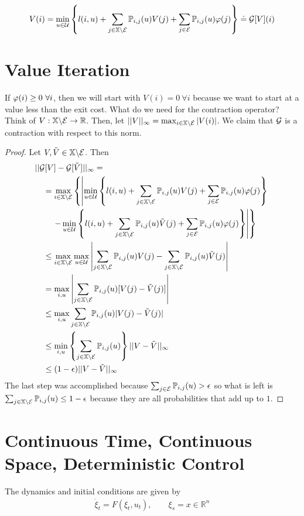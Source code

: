 \begin{equation*}
V(i) = \min_{u\in\mathcal{U}}\left\lbrace l(i,u) + \sum_{j\in\mathbb{X}\backslash\mathcal{E}}\mathbb{P}_{i,j}(u)V(j) + \sum_{j\in\mathcal{E}}\mathbb{P}_{i,j}(u)\varphi(j)\right\rbrace \doteq \mathcal{G}[V](i)
\end{equation*}


\section{Value Iteration}
If $\varphi(i)\geq0~\forall i$, then we will start with $V(i)=0~\forall i$ because we want to start at a value less than the exit cost.
What do we need for the contraction operator? Think of $V:\mathbb{X}\backslash\mathcal{E}\to\mathbb{R}$.
Then, let $||V||_\infty = \max_{i\in\mathbb{X}\backslash\mathcal{E}}|V(i)|$.
We claim that $\mathcal{G}$ is a contraction with respect to this norm.

\begin{proof}
Let $V,\tilde{V}\in\mathbb{X}\backslash\mathcal{E}$.
Then
\begin{align*}
&||\mathcal{G}[V]-\mathcal{G}[\tilde{V}]||_\infty = \\
&\quad = \max_{i\in\mathbb{X}\backslash\mathcal{E}}\left\lbrace \left| \min_{u\in\mathcal{U}}\left\lbrace l(i,u) + \sum_{j\in\mathbb{X}\backslash\mathcal{E}}\mathbb{P}_{i,j}(u)V(j) + \sum_{j\in\mathcal{E}}\mathbb{P}_{i,j}(u)\varphi(j)\right\rbrace \right.\right. \\
&\left.\left.\qquad - \min_{u\in\mathcal{U}}\left\lbrace l(i,u) + \sum_{j\in\mathbb{X}\backslash\mathcal{E}}\mathbb{P}_{i,j}(u)\tilde{V}(j) + \sum_{j\in\mathcal{E}}\mathbb{P}_{i,j}(u)\varphi(j) \right\rbrace\right|\right\rbrace \\
&\quad\leq \max_{i\in\mathbb{X}\backslash\mathcal{E}} \max_{u\in\mathcal{U}} \left|\sum_{j\in\mathbb{X}\backslash\mathcal{E}}\mathbb{P}_{i,j}(u)V(j) - \sum_{j\in\mathbb{X}\backslash\mathcal{E}}\mathbb{P}_{i,j}(u)\tilde{V}(j)\right| \\
&\quad= \max_{i,u} \left| \sum_{j\in\mathbb{X}\backslash\mathcal{E}}\mathbb{P}_{i,j}(u)[V(j)-\tilde{V}(j)]\right| \\
&\quad\leq \max_{i,u} \sum_{j\in\mathbb{X}\backslash\mathcal{E}}\mathbb{P}_{i,j}(u)|V(j)-\tilde{V}(j)| \\
&\quad\leq \min_{i,u} \left\lbrace \sum_{j\in\mathbb{X}\backslash\mathcal{E}}\mathbb{P}_{i,j}(u)\right\rbrace ||V-\tilde{V}||_\infty \\
&\quad\leq (1-\epsilon)||V-\tilde{V}||_\infty
\end{align*}
The last step was accomplished because $\sum_{j\in\mathcal{E}}\mathbb{P}_{i,j}(u)>\epsilon$ so what is left is $\sum_{j\in\mathbb{X}\backslash\mathcal{E}}\mathbb{P}_{i,j}(u)\leq1-\epsilon$ because they are all probabilities that add up to $1$.
\end{proof}

\section{Continuous Time, Continuous Space, Deterministic Control}
The dynamics and initial conditions are given by
\begin{align}
\label{eq:ctcsdynamics}
\dot{\xi}_t = F(\xi_t,u_t), \qquad \xi_s=x\in\mathbb{R}^n
\end{align}


